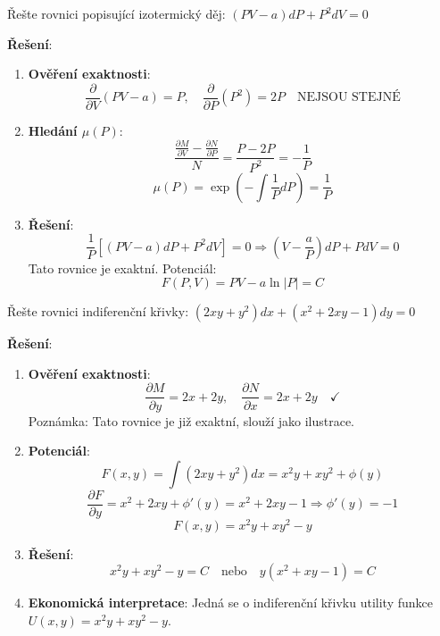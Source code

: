 \begin{example}
Řešte rovnici popisující izotermický děj: $(PV - a)dP + P^2 dV = 0$
\vspace{0.3\baselineskip}

\textbf{Řešení}:
\begin{enumerate}
\item \textbf{Ověření exaktnosti}:
\[
\frac{\partial}{\partial V}(PV - a) = P, \quad \frac{\partial}{\partial P}(P^2) = 2P \quad \text{NEJSOU STEJNÉ}
\]

\item \textbf{Hledání $\mu(P)$}:
\[
\frac{\frac{\partial M}{\partial V} - \frac{\partial N}{\partial P}}{N} = \frac{P - 2P}{P^2} = -\frac{1}{P}
\]
\[
\mu(P) = \exp\left(-\int \frac{1}{P} dP\right) = \frac{1}{P}
\]

\item \textbf{Řešení}:
\[
\frac{1}{P}[(PV - a)dP + P^2 dV] = 0 \Rightarrow (V - \frac{a}{P})dP + P dV = 0
\]
Tato rovnice je exaktní. Potenciál:
\[
F(P, V) = PV - a\ln|P| = C
\]
\end{enumerate}
\end{example}

\vspace{0.6\baselineskip}

\begin{example}
Řešte rovnici indiferenční křivky: $(2xy + y^2)dx + (x^2 + 2xy - 1)dy = 0$
\vspace{0.3\baselineskip}

\textbf{Řešení}:
\begin{enumerate}
\item \textbf{Ověření exaktnosti}:
\[
\frac{\partial M}{\partial y} = 2x + 2y, \quad \frac{\partial N}{\partial x} = 2x + 2y \quad \checkmark
\]
Poznámka: Tato rovnice je již exaktní, slouží jako ilustrace.

\item \textbf{Potenciál}:
\[
F(x, y) = \int (2xy + y^2)dx = x^2y + xy^2 + \phi(y)
\]
\[
\frac{\partial F}{\partial y} = x^2 + 2xy + \phi'(y) = x^2 + 2xy - 1 \Rightarrow \phi'(y) = -1
\]
\[
F(x, y) = x^2y + xy^2 - y
\]

\item \textbf{Řešení}:
\[
x^2y + xy^2 - y = C \quad \text{nebo} \quad y(x^2 + xy - 1) = C
\]

\item \textbf{Ekonomická interpretace}: Jedná se o indiferenční křivku utility funkce $U(x, y) = x^2y + xy^2 - y$.
\end{enumerate}
\end{example}


